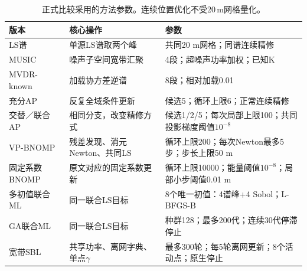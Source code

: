 \begin{table}[htbp]\centering\footnotesize
\caption{正式比较采用的方法参数。连续位置优化不受20\,m网格量化。}\label{tab:parameters}
\begin{tabularx}{\linewidth}{@{}p{.18\linewidth}p{.27\linewidth}X@{}}\toprule
版本 & 核心操作 & 参数\\\midrule
LS谱 & 单源LS谱取两个峰 & 共同20 m网格；同谱连续精修\\
MUSIC & 噪声子空间宽带汇聚 & 4段；超噪声功率加权；已知K\\
MVDR-known & 加载协方差逆谱 & 8段；相对加载0.01\\
充分AP & 反复全域条件更新 & 候选5；循环上限6；正常连续精修\\
交替／联合AP & 相同分支，改变精修方式 & 候选1/2/5；每次局部上限100；共同投影梯度阈值$10^{-8}$\\
VP-BNOMP & 残差发现、消元Newton、共同LS & 循环上限200；每次Newton最多5步；步长上限50 m\\
固定系数BNOMP & 原文对应的固定系数更新 & 循环上限10000；能量阈值$10^{-8}$；局部小步阈值0.01 m\\
多初值联合ML & 同一联合LS目标 & 8个唯一初值：4谱峰+4 Sobol；L-BFGS-B\\
GA联合ML & 同一联合LS目标 & 种群128；最多200代；连续30代停滞停止\\
宽带SBL & 共享功率、离网字典、单点$\gamma$ & 最多300轮；每5轮离网更新；8个活动点；原生停止\\
\bottomrule\end{tabularx}\end{table}
